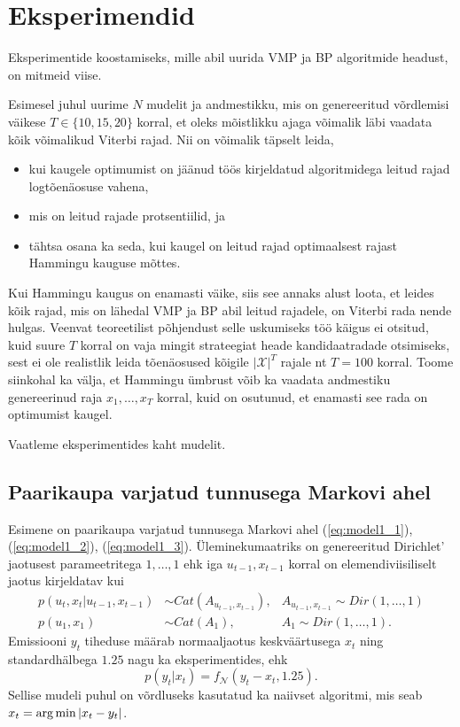 \section{Eksperimendid}

Eksperimentide koostamiseks, mille abil uurida VMP ja BP algoritmide headust, on mitmeid viise. 

Esimesel juhul uurime $N$ mudelit ja andmestikku, mis on genereeritud võrdlemisi väikese $T \in \{10,15,20\}$ korral, et oleks mõistlikku ajaga võimalik läbi vaadata kõik võimalikud Viterbi rajad. Nii on võimalik täpselt leida,
\begin{itemize}
    \item kui kaugele optimumist on jäänud töös kirjeldatud algoritmidega leitud rajad logtõenäosuse vahena,
    \item mis on leitud rajade protsentiilid, ja
    \item tähtsa osana ka seda, kui kaugel on leitud rajad optimaalsest rajast Hammingu kauguse mõttes.
\end{itemize}
Kui Hammingu kaugus on enamasti väike, siis see annaks alust loota, et leides kõik rajad, mis on lähedal VMP ja BP abil leitud rajadele, on Viterbi rada nende hulgas. Veenvat teoreetilist põhjendust selle uskumiseks töö käigus ei otsitud, kuid suure $T$ korral on vaja mingit strateegiat heade kandidaatradade otsimiseks, sest ei ole realistlik leida tõenäosused kõigile $|\mathcal{X}|^T$ rajale nt $T=100$ korral. Toome siinkohal ka välja, et Hammingu ümbrust võib ka vaadata andmestiku genereerinud raja $x_1,\ldots,x_T$ korral, kuid on osutunud, et enamasti see rada on optimumist kaugel.

Vaatleme eksperimentides kaht mudelit. 

\subsection{Paarikaupa varjatud tunnusega Markovi ahel}

Esimene on paarikaupa varjatud tunnusega Markovi ahel (\ref{eq:model1_1}), (\ref{eq:model1_2}), (\ref{eq:model1_3}). Üleminekumaatriks on genereeritud Dirichlet' jaotusest parameetritega $1,\ldots,1$ ehk iga $u_{t-1},x_{t-1}$ korral on elemendiviisiliselt jaotus kirjeldatav kui
\begin{align}
    \label{eq:hmm1}
    p(u_t,x_t | u_{t-1},x_{t-1}) &\sim Cat(A_{u_{t-1},x_{t-1}}),& A_{u_{t-1},x_{t-1}} \sim Dir(1,\ldots,1)\\
    \label{eq:hmm2}
    p(u_1,x_1) &\sim Cat(A_1), &A_1 \sim Dir(1,\ldots,1) .
\end{align}
Emissiooni $y_t$ tiheduse määrab normaaljaotus keskväärtusega $x_t$ ning standardhälbega $1.25$ nagu ka \parencite{Soop.2023} eksperimentides, ehk 
\begin{equation}
    \label{eq:hmm3}
    p(y_t|x_t) = f_{\mathcal{N}}(y_t-x_t,1.25).
\end{equation}
Sellise mudeli puhul on võrdluseks kasutatud ka naiivset algoritmi, mis seab $x_t = \operatorname*{arg\,min} |x_t - y_t|$.

